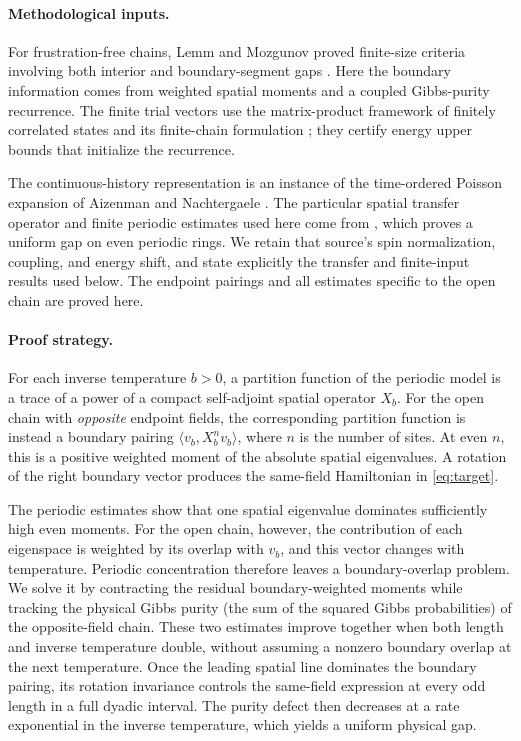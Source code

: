 \documentclass[11pt]{article}
\theoremstyle{remark}
\numberwithin{equation}{section}
\begin{document}
\paragraph{Methodological inputs.}
For frustration-free chains, Lemm and Mozgunov proved finite-size
criteria involving both interior and boundary-segment gaps
\cite{LemmMozgunov2019}. Here the boundary information comes from
weighted spatial moments and a coupled Gibbs-purity recurrence.
The finite trial vectors use the matrix-product framework of finitely
correlated states \cite{FNW1992} and its finite-chain formulation
\cite{PerezGarcia2007}; they certify energy upper bounds that
initialize the recurrence.

The continuous-history representation is an instance of the
time-ordered Poisson expansion of Aizenman and Nachtergaele
\cite{AizenmanNachtergaele1994}. The particular spatial transfer
operator and finite periodic estimates used here come from
\cite{periodic}, which proves a uniform gap on even periodic rings.
We retain that source's spin normalization, coupling, and energy
shift, and state explicitly the transfer and finite-input results
used below. The endpoint pairings and all estimates specific to the
open chain are proved here.


\paragraph{Proof strategy.}
For each inverse temperature $b>0$, a partition function of the
periodic model is a trace of a power of a compact self-adjoint spatial
operator $X_b$. For the open chain with \emph{opposite} endpoint fields,
the corresponding partition function is instead a boundary pairing
$\langle v_b,X_b^n v_b\rangle$, where $n$ is the number of sites.
At even $n$, this is a positive weighted moment of the absolute spatial
eigenvalues. A rotation of the right boundary vector produces the
same-field Hamiltonian in \eqref{eq:target}.

The periodic estimates show that one spatial eigenvalue dominates
sufficiently high even moments. For the open chain, however, the contribution of
each eigenspace is weighted by its overlap with $v_b$, and this vector
changes with temperature. Periodic concentration therefore leaves a
boundary-overlap problem. We solve it by contracting the residual
boundary-weighted moments while tracking the physical Gibbs
purity (the sum of the squared Gibbs probabilities) of the opposite-field
chain. These two estimates improve together
when both length and inverse temperature double, without assuming a
nonzero boundary overlap at the next temperature. Once the leading
spatial line dominates the boundary pairing, its rotation invariance
controls the same-field expression at every odd length in a full
dyadic interval. The purity defect then decreases at a rate exponential
in the inverse temperature, which yields a uniform physical gap.
\end{document}
